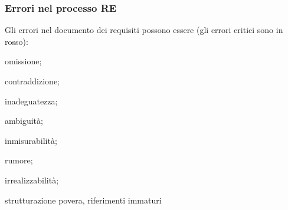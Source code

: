\subsubsection{Errori nel processo RE}
Gli errori nel documento dei requisiti possono essere (gli errori critici sono in rosso):
\begin{itemize}
	{\color{red}\item omissione;
		\item contraddizione;
		\item inadeguatezza;
		\item ambiguità;}
	\item inmisurabilità;
	\item rumore;
	\item irrealizzabilità;
	\item strutturazione povera, riferimenti immaturi
\end{itemize}
